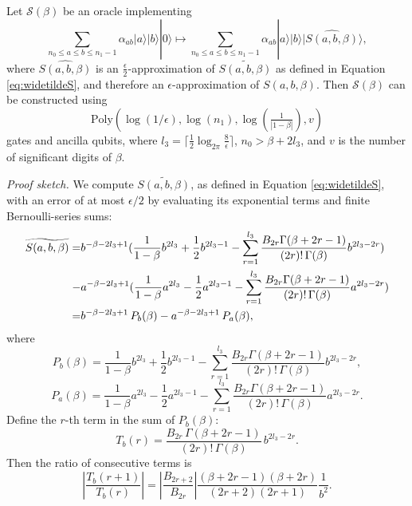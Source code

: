 \documentclass[aps,pra,twocolumn,superscriptaddress,preprintnumbers,amsmath,amssymb]{revtex4-2}
\begin{document}
\begin{lemma}\label{S oracle}
Let $\mathcal{S}(\beta)$ be an oracle implementing 
\begin{equation}
\sum_{n_0\leq a\leq b\leq n_1-1}\alpha_{ab}|a\rangle|b\rangle|0\rangle\mapsto\sum_{n_0\leq a\leq b\leq n_1-1}\alpha_{ab}|a\rangle|b\rangle|\widehat{S(a,b,\beta)}\rangle,
\end{equation}
where $\widehat{S(a,b,\beta)}$ is an $\frac{\epsilon}{2}$-approximation of $\widetilde{S(a,b,\beta)}$  as defined in Equation \eqref{eq:widetildeS}, and therefore an $\epsilon$-approximation of $S(a,b,\beta)$.
Then $\mathcal{S}(\beta)$ can be constructed  using
    \begin{equation}
        \mathrm{Poly}(\log(1/\epsilon),\log(n_1),\log(\tfrac{1}{|1-\beta|}),v)
    \end{equation}
gates and ancilla qubits, where $l_3=\lceil\frac{1}{2}\log_{2\pi}\frac{8}{\epsilon}\rceil$, $n_0>\beta+2l_3$, and $v$ is the number of significant digits of $\beta$.
\end{lemma}
\noindent\textit{Proof sketch.}
We compute \(\widetilde{S(a, b, \beta)}\), as defined in Equation \eqref{eq:widetildeS}, with an error of at most \(\epsilon/2\) by evaluating its exponential terms and finite Bernoulli-series sums:
\begin{align}
    \widetilde{S(a,b,\beta)}=&b^{-\beta-2l_3+1}(\frac{1}{1-\beta}b^{2l_3}+\frac{1}{2}b^{2l_3-1}-\sum_{r=1}^{l_3} \frac{B_{2r}\Gamma(\beta+2r-1)}{(2r)!\,\Gamma(\beta)} b^{2l_3-2r})\notag\\
    -&a^{-\beta-2l_3+1}(\frac{1}{1-\beta}a^{2l_3}-\frac{1}{2}a^{2l_3-1}-\sum_{r=1}^{l_3} \frac{B_{2r}\Gamma(\beta+2r-1)}{(2r)!\,\Gamma(\beta)} a^{2l_3-2r})\notag\\
    =& b^{-\beta-2l_3+1}\,P_b(\beta)- a^{-\beta-2l_3+1}\,P_a(\beta),
\end{align}
where
\[
P_b(\beta)=\frac{1}{1-\beta}b^{2l_3}+\frac{1}{2}b^{2l_3-1}
  -\sum_{r=1}^{l_3} \frac{B_{2r}\Gamma(\beta+2r-1)}{(2r)!\,\Gamma(\beta)} b^{2l_3-2r},
\]
\[
P_a(\beta)=\frac{1}{1-\beta}a^{2l_3}-\frac{1}{2}a^{2l_3-1}
  -\sum_{r=1}^{l_3} \frac{B_{2r}\Gamma(\beta+2r-1)}{(2r)!\,\Gamma(\beta)} a^{2l_3-2r}.
\]
Define the \( r \)-th term in the sum of \( P_b(\beta) \):
\[
T_b(r)=\frac{B_{2r}\,\Gamma(\beta+2r-1)}{(2r)!\,\Gamma(\beta)}\,b^{2l_3-2r}.
\]
Then the ratio of consecutive terms is
\[
\left|\frac{T_b(r+1)}{T_b(r)}\right|
= \left|\frac{B_{2r+2}}{B_{2r}}\right|
  \frac{(\beta+2r-1)(\beta+2r)}{(2r+2)(2r+1)}\frac{1}{b^{2}}.
\]
\end{document}
